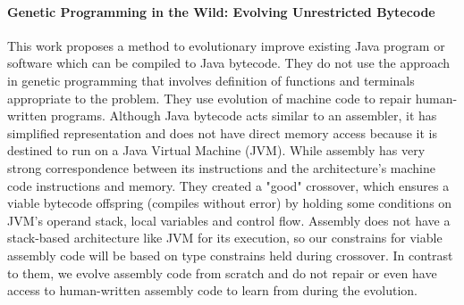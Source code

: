 \documentclass[dvipsnames,format=sigconf,anonymous=true,review=true]{acmart}
\begin{document}
\paragraph{Genetic Programming in the Wild: Evolving Unrestricted Bytecode}
This work \cite{Orlov2009Genetic} proposes a method to evolutionary improve existing Java program or software which can be compiled to Java bytecode. They do not use the approach in genetic programming that involves definition of functions and terminals appropriate to the problem. They use evolution of machine code to repair human-written programs. Although Java bytecode acts similar to an assembler, it has simplified representation and does not have direct memory access because it is destined to run on a Java Virtual Machine (JVM). While assembly has very strong correspondence between its instructions and the architecture's machine code instructions and memory. They created a "good" crossover, which ensures a viable bytecode offspring (compiles without error) by holding some conditions on JVM's operand stack, local variables and control flow. Assembly does not have a stack-based architecture like JVM for its execution, so our constrains for viable assembly code will be based on type constrains held during crossover.
In contrast to them, we evolve assembly code from scratch and do not repair or even have access to human-written assembly code to learn from during the evolution.
\end{document}
